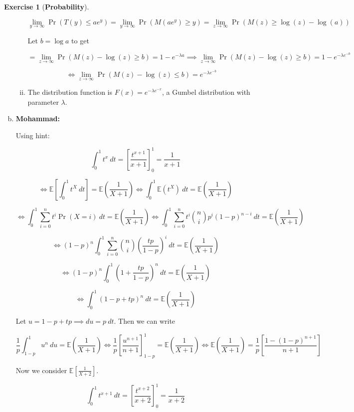 \documentclass{article}
\theoremstyle{definition}
\newtheorem{exercise}{Exercise}
\theoremstyle{definition}
\theoremstyle{definition}
\theoremstyle{definition}
\theoremstyle{definition}
\newcommand{\E}{\mathbb{E}}
\begin{document}
\begin{exercise}[\textbf{Probability}]
\begin{enumerate}[(a)]
\begin{enumerate}[(i)]
\[
\lim_{y \to \infty} \Pr(T(y) \leq a e^y)  = \lim_{y \to \infty} \Pr( M(ae^y) \geq y)  = \lim_{z \to \infty} \Pr( M(z) \geq \log(z) - \log(a)) 
\]

Let \(b = \log a\) to get 

\[
= \lim_{z \to \infty} \Pr( M(z) - \log(z) \geq   b) = 1 - e^{-\lambda a} \implies  \lim_{z \to \infty} \Pr( M(z) - \log(z) \geq  b)  = 1 - e^{-\lambda e^{-b}}
\]

\[
 \iff \lim_{z \to \infty} \Pr( M(z) - \log(z) \leq  b)  = e^{-\lambda e^{-b}}
\]

\item The distribution function is \(F(x) = e^{-\lambda e^{-x}}\), a Gumbel distribution with parameter \(\lambda\).

\end{enumerate}

\item \textbf{Mohammad:}

Using hint:

\[
\int_0^1 t^x  \ dt = \left[ \frac{t^{x+1}}{x+1} \right]_0^1 =  \frac{1}{x+1}
\]

\[
 \iff \E \left[ \int_0^1 t^X  \ dt \right] = \E \left( \frac{1}{X+1} \right)  \iff \int_0^1 \E ( t^X)  \ dt = \E \left( \frac{1}{X+1} \right)
\]

\[
\iff \int_0^1 \sum_{i=0}^n t^i \Pr(X = i) \ dt = \E \left( \frac{1}{X+1} \right) \iff \int_0^1 \sum_{i=0}^n t^i \binom{n}{i} p^i (1-p)^{n-i} \ dt = \E \left( \frac{1}{X+1} \right)
\]

\[
 \iff (1-p)^n \int_0^1 \sum_{i=0}^n \binom{n}{i} \left( \frac{tp}{1-p} \right) ^i  \ dt = \E \left( \frac{1}{X+1} \right)
\]

\[
 \iff (1-p)^n \int_0^1 \left( 1 + \frac{tp}{1-p} \right)^n  \ dt = \E \left( \frac{1}{X+1} \right)
\]

\[
 \iff  \int_0^1 \left( 1 - p + tp  \right)^n  \ dt = \E \left( \frac{1}{X+1} \right)
\]

Let \(u = 1 - p + tp \implies du = p \ dt\). Then we can write

\[
\frac{1}{p} \int_{1-p}^1 u^n  \ du = \E \left( \frac{1}{X+1} \right) \iff \frac{1}{p} \left[ \frac{u^{n+1}}{n+1} \right]_{1-p}^1= \E \left( \frac{1}{X+1} \right)  \iff \E \left( \frac{1}{X+1} \right) = \frac{1}{p} \left[ \frac{1 - (1-p)^{n+1}}{n+1} \right]
\]

Now we consider \(\E \left[ \frac{1}{X+2} \right] \). 

\[
\int_0^1 t^{x+1}  \ dt = \left[ \frac{t^{x+2}}{x+2} \right]_0^1 =  \frac{1}{x+2}
\]


\end{enumerate}
\end{exercise}
\end{document}
